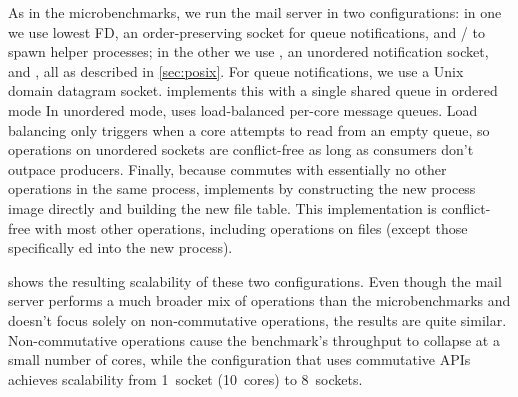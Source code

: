 As in the microbenchmarks, we run the mail server in two configurations:
in one we use lowest FD, an order-preserving socket for queue
notifications, and / to spawn helper processes; in
the other we use , an unordered notification socket, and
, all as described in \cref{sec:posix}.
For queue notifications, we use a Unix domain datagram socket.
\sys implements this with a single shared queue in ordered mode
%
In unordered mode, \sys uses load-balanced per-core message queues.
Load balancing only triggers when a core attempts to read from an
empty queue, so operations on unordered sockets are conflict-free as
long as consumers don't outpace producers.
%
Finally, because  commutes with essentially no other
operations in the same process,
\sys implements  by constructing the new process image
directly and building the new file
table. This implementation is conflict-free with most other operations,
including operations on
 files (except those specifically ed into the
new process).

\begin{figure}
  \centering
  
  \label{fig:mailbench}
\end{figure}

 shows the resulting scalability of these two
configurations.  Even though the mail server performs a much broader mix
of operations than the microbenchmarks and doesn't focus solely on
non-commutative operations, the results are quite similar.
Non-commutative operations cause the benchmark's throughput to collapse
at a small number of cores, while the configuration that uses
commutative APIs achieves 
scalability from 1~socket
(10~cores) to 8~sockets.
%
%


